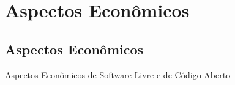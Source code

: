 \documentclass[xcolor=dvipsnames]{beamer}
\begin{document}
% 	
% 

\section{Aspectos Econômicos}	
\subsection{Aspectos Econômicos}	

\begin{frame}
\vspace{0.2cm}
\begin{center}
\Huge{Aspectos Econômicos de Software Livre e de Código Aberto}
\end{center}

\end{frame}
\end{document}
